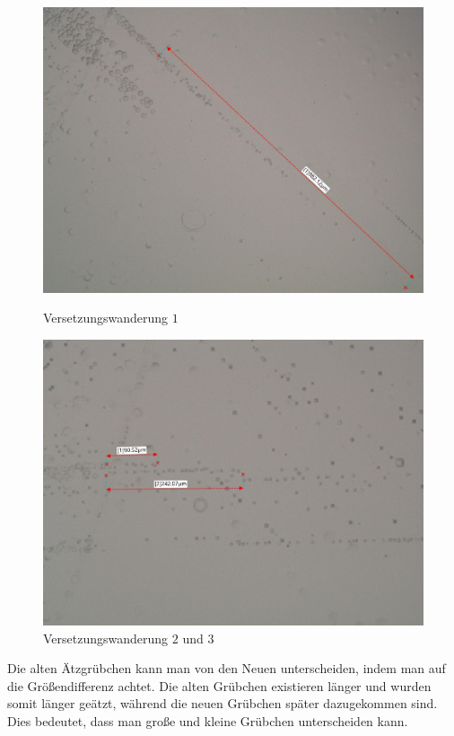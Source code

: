 \documentclass[12pt,a4paper]{scrartcl}
\numberwithin{equation}{section} %
\begin{document}
\begin{figure}[ht]
	\vspace{8pt}
	\begin{minipage}[t]{.5\linewidth}
		\includegraphics[width=\textwidth]{../media/B2.8/Druck1.pdf}
		\caption{Versetzungswanderung $1$}
		\label{abb:Druck 1}
	\end{minipage}
	\begin{minipage}[t]{.5\linewidth}
		\includegraphics[width=\textwidth]{../media/B2.8/Druck2.pdf}
		\caption{Versetzungswanderung $2$ und $3$}
		\label{abb:Druck 2}
	\end{minipage}
\end{figure}

Die alten Ätzgrübchen kann man von den Neuen unterscheiden, indem man auf die Größendifferenz achtet. Die alten Grübchen existieren länger und wurden somit länger geätzt, während die neuen Grübchen später dazugekommen sind. Dies bedeutet, dass man große und kleine Grübchen unterscheiden kann.
\end{document}
